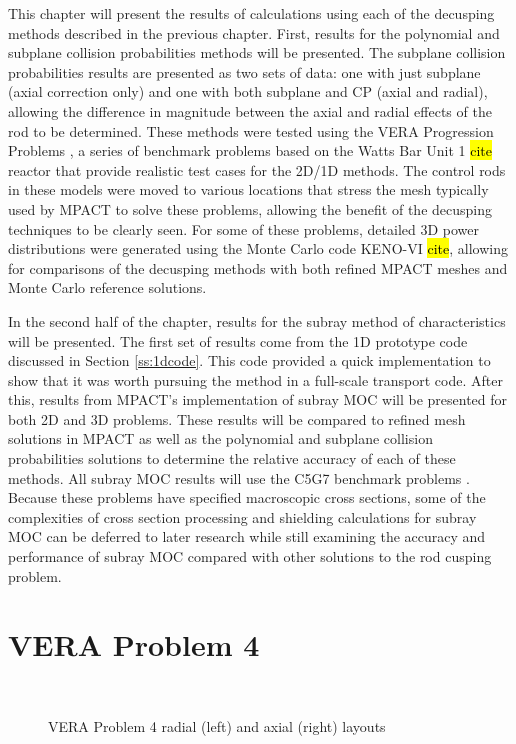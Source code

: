 This chapter will present the results of calculations using each of the decusping methods described in the previous chapter.  First, results for the polynomial and subplane collision probabilities methods will be presented.  The subplane collision probabilities results are presented as two sets of data: one with just subplane (axial correction only) and one with both subplane and CP (axial and radial), allowing the difference in magnitude between the axial and radial effects of the rod to be determined.  These methods were tested using the VERA Progression Problems \cite{VERAProgressionProblems}, a series of benchmark problems based on the Watts Bar Unit 1 \hl{cite} reactor that provide realistic test cases for the 2D/1D methods.  The control rods in these models were moved to various locations that stress the mesh typically used by MPACT to solve these problems, allowing the benefit of the decusping techniques to be clearly seen.  For some of these problems, detailed 3D power distributions were generated using the Monte Carlo code KENO-VI \hl{cite}, allowing for comparisons of the decusping methods with both refined MPACT meshes and Monte Carlo reference solutions.

In the second half of the chapter, results for the subray method of characteristics will be presented.  The first set of results come from the 1D prototype code discussed in Section \ref{ss:1dcode}.  This code provided a quick implementation to show that it was worth pursuing the method in a full-scale transport code.  After this, results from MPACT's implementation of subray MOC will be presented for both 2D and 3D problems.  These results will be compared to refined mesh solutions in MPACT as well as the polynomial and subplane collision probabilities solutions to determine the relative accuracy of each of these methods.  All subray MOC results will use the C5G7 benchmark problems \cite{EELewisC5G72003,EELewisC5G7extended2005}.  Because these problems have specified macroscopic cross sections, some of the complexities of cross section processing and shielding calculations for subray MOC can be deferred to later research while still examining the accuracy and performance of subray MOC compared with other solutions to the rod cusping problem.

\section{VERA Problem 4}\label{s:vera4}

\begin{figure}[h]\label{f:p4layout}
    \centering
    ~
    \caption{VERA Problem 4 radial (left) and axial (right) layouts}\label{f:p4}
\end{figure}

